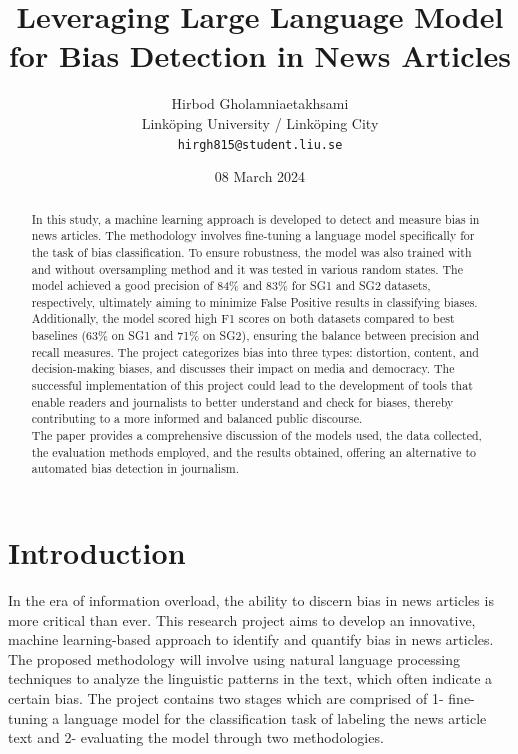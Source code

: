 \documentclass[11pt,a4paper]{article}
\title{Leveraging Large Language Model for Bias Detection in News Articles}
\author{Hirbod Gholamniaetakhsami \\
  Linköping University / Linköping City \\
  \texttt{hirgh815@student.liu.se}}
\date{08 March 2024}
\begin{document}
\maketitle
\begin{abstract}
In this study, a machine learning approach is developed to detect and measure bias in news articles. The methodology involves fine-tuning a language model specifically for the task of bias classification. To ensure robustness, the model was also trained with and without oversampling method and it was tested in various random states. The model achieved a good precision of 84\% and 83\% for SG1 and SG2 datasets, respectively, ultimately aiming to minimize False Positive results in classifying biases.\\
Additionally, the model scored high F1 scores on both datasets compared to best baselines (63\% on SG1 and 71\% on SG2), ensuring the balance between precision and recall measures. The project categorizes bias into three types: distortion, content, and decision-making biases, and discusses their impact on media and democracy. The successful implementation of this project could lead to the development of tools that enable readers and journalists to better understand and check for biases, thereby contributing to a more informed and balanced public discourse.\\
The paper provides a comprehensive discussion of the models used, the data collected, the evaluation methods employed, and the results obtained, offering an alternative to automated bias detection in journalism.
\end{abstract}

\section{Introduction}

In the era of information overload, the ability to discern bias in news articles is more critical than ever. This research project aims to develop an innovative, machine learning-based approach to identify and quantify bias in news articles. The proposed methodology will involve using natural language processing techniques to analyze the linguistic patterns in the text, which often indicate a certain bias. The project contains two stages which are comprised of 1- fine-tuning a language model for the classification task of labeling the news article text and 2- evaluating the model through two methodologies. 
\end{document}
